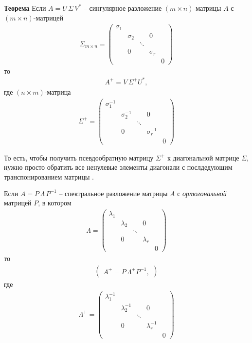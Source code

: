\documentclass[%
	11pt,
	a4paper,
	utf8,
		]{article}
\begin{document}
\textbf{Теорема} Если $ A = U \, \Sigma \, V^* $ -- сингулярное разложение $ (m \times n) $-матрицы $ A $ с $ (m \times n) $-матрицей
\begin{align*}
	\Sigma_{m \times n} = \begin{pmatrix}
		\sigma_1 & {} & {} & {} & {} \\
		{} & \sigma_2 & {} & 0 & {} \\
		{} & {} & \ddots & {} & {} \\
		{} & 0 & {} & \sigma_r & {} \\
		{} & {} & {} & {} & 0
	\end{pmatrix}
\end{align*}
то
\begin{align*}
	A^+ = V \, \Sigma^+ U^*,
\end{align*}
где $ (n \times m) $-матрица
\begin{align*}
	\Sigma^+ = \begin{pmatrix}
		\sigma_1^{-1} & {} & {} & {} & {} \\
		{} & \sigma_2^{-1} & {} & 0 & {} \\
		{} & {} & \ddots & {} & {} \\
		{} & 0 & {} & \sigma_r^{-1} & {} \\
		{} & {} & {} & {} & 0
	\end{pmatrix}
\end{align*}

То есть, чтобы получить псевдообратную матрицу $ \Sigma^+ $ к диагональной матрице $ \Sigma $, нужно просто обратить все ненулевые элементы диагонали с послдедующим транспонированием матрицы \cite[]{goodfellow:ml-2018}.

Если $ A = P \, \Lambda \, P^{-1} $ -- спектральное разложение матрицы $ A $ с \emph{ортогональной} матрицей $ P $, в котором
\begin{align*}
	\Lambda = \begin{pmatrix}
		\lambda_1 & {} & {} & {} & {} \\
		{} & \lambda_2 & {} & 0 & {} \\ 
		{} & {} & \ddots & {} & {} \\
		{} & 0 & {} & \lambda_r & {} \\
		{} & {} & {} & {} & 0
    \end{pmatrix}
\end{align*}
то 
\begin{align*}
	\begin{pmatrix}
		A^+ = P \, \Lambda^+ P^{-1},
	\end{pmatrix}
\end{align*}
где
\begin{align*}
	\Lambda^+ = \begin{pmatrix}
		\lambda_1^{-1} & {} & {} & {} & {} \\
		{} & \lambda_2^{-1} & {} & 0 & {} \\
		{} & {} & \ddots & {} & {} \\
		{} & 0 & {} & \lambda_r^{-1} & {} \\
		{} & {} & {} & {} & 0
	\end{pmatrix}
\end{align*}
\end{document}
